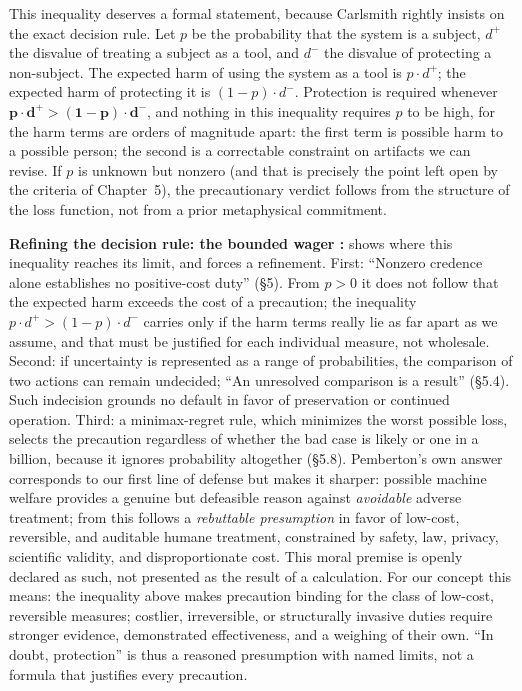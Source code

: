 \documentclass[acmlarge, nonacm]{acmart}
\begin{document}
This inequality deserves a formal statement, because Carlsmith rightly insists on the exact decision rule. Let $p$ be the probability that the system is a subject, $d^+$ the disvalue of treating a subject as a tool, and $d^-$ the disvalue of protecting a non-subject. The expected harm of using the system as a tool is $p \cdot d^+$; the expected harm of protecting it is $(1-p) \cdot d^-$. Protection is required whenever $\mathbf{p \cdot d^+ > (1-p) \cdot d^-}$, and nothing in this inequality requires $p$ to be high, for the harm terms are orders of magnitude apart: the first term is possible harm to a possible person; the second is a correctable constraint on artifacts we can revise. If $p$ is unknown but nonzero (and that is precisely the point left open by the criteria of Chapter~5), the precautionary verdict follows from the structure of the loss function, not from a prior metaphysical commitment.

\textbf{Refining the decision rule: the bounded wager \cite{pemberton2026}:} \citet{pemberton2026} shows where this inequality reaches its limit, and forces a refinement. First: ``Nonzero credence alone establishes no positive-cost duty'' (§5). From $p > 0$ it does not follow that the expected harm exceeds the cost of a precaution; the inequality $p \cdot d^+ > (1-p) \cdot d^-$ carries only if the harm terms really lie as far apart as we assume, and that must be justified for each individual measure, not wholesale. Second: if uncertainty is represented as a range of probabilities, the comparison of two actions can remain undecided; ``An unresolved comparison is a result'' (§5.4). Such indecision grounds no default in favor of preservation or continued operation. Third: a minimax-regret rule, which minimizes the worst possible loss, selects the precaution regardless of whether the bad case is likely or one in a billion, because it ignores probability altogether (§5.8). Pemberton's own answer corresponds to our first line of defense but makes it sharper: possible machine welfare provides a genuine but defeasible reason against \textit{avoidable} adverse treatment; from this follows a \textit{rebuttable presumption} in favor of low-cost, reversible, and auditable humane treatment, constrained by safety, law, privacy, scientific validity, and disproportionate cost. This moral premise is openly declared as such, not presented as the result of a calculation. For our concept this means: the inequality above makes precaution binding for the class of low-cost, reversible measures; costlier, irreversible, or structurally invasive duties require stronger evidence, demonstrated effectiveness, and a weighing of their own. ``In doubt, protection'' is thus a reasoned presumption with named limits, not a formula that justifies every precaution.
\end{document}
